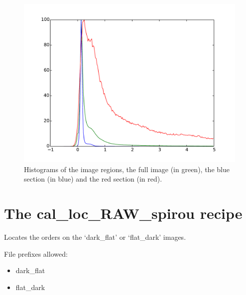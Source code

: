 \begin{figure}
\begin{center}
\includegraphics[width=.8\textwidth]{figures/cal_DARK_spirou_3.pdf}
\caption{Histograms of the image regions, the full image (in green), the blue section (in blue) and the red section (in red).\label{figure:cal_DARK_spirou_3}}
\end{center}
\end{figure}

\clearpage
\newpage
\section{The cal\_loc\_RAW\_spirou recipe}
\label{section:cal_loc_RAW_spirou}

Locates the orders on the `dark\_flat' or `flat\_dark' images.\\


\noindent File prefixes allowed:
\begin{itemize}
	\item dark\_flat
	\item flat\_dark
\end{itemize}


